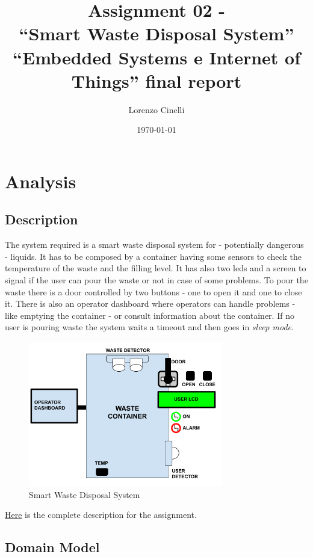 \documentclass[a4paper,12pt]{report}
\title{Assignment 02 - \\``Smart Waste Disposal System''\\
    \large ``Embedded Systems e Internet of Things'' final report}
\author{Lorenzo Cinelli}
\date{\today}
\begin{document}
\maketitle

\tableofcontents

\chapter{Analysis}

    \section{Description}

        The system required is a smart waste disposal system for - potentially dangerous - liquids. It has to be composed by a container having some sensors to check the temperature of the waste and the filling level. It has also two leds and a screen to signal if the user can pour the waste or not in case of some problems. To pour the waste there is a door controlled by two buttons - one to open it and one to close it. 
        There is also an operator dashboard where operators can handle problems - like emptying the container - or consult information about the container. If no user is pouring waste the system waits a timeout and then goes in \textit{sleep mode}. 

        \begin{figure}[H]
        	\centering{}
        	\includegraphics[width=240pt]{img/Assignment-02_SWDS-Domain.png}
        	\caption{Smart Waste Disposal System}
        	\label{img:system}
        \end{figure}
        \centerline{\href{https://docs.google.com/document/d/1iFXGmo7RVZMpJ5bxUN5ms_qFqg2B-wecRc0sfas9rQ4/edit?tab=t.0}{Here} is the complete description for the assignment.}
            
    \section{Domain Model}
    
\end{document}
